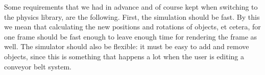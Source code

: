 Some requirements that we had in advance and of course kept when switching to the physics library, are the following. First, the simulation should be fast. By this we mean that calculating the new positions and rotations of objects, et cetera, for one frame should be fast enough to leave enough time for rendering the frame as well. The simulator should also be flexible: it must be easy to add and remove objects, since this is something that happens a lot when the user is editing a conveyor belt system.